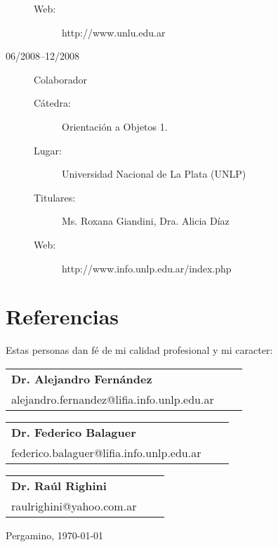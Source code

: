 \documentclass[a4paper]{article}
\begin{document}
\begin{description}
\begin{description}
    \item[Web: ] http://www.unlu.edu.ar
	\end{description}
\item[06/2008--12/2008] Colaborador
	\begin{description}
	\item[Cátedra: ] Orientación a Objetos 1.
	\item[Lugar: ] Universidad Nacional de La Plata (UNLP)
	\item[Titulares: ] Ms. Roxana Giandini, Dra. Alicia Díaz
    \item[Web: ] http://www.info.unlp.edu.ar/index.php
	\end{description}
\end{description}

\section{Referencias}
\noindent Estas personas dan fé de mi calidad profesional y mi caracter:
\begin{table}[h]
\begin{tabular}{@{}lll@{}}
\textbf{Dr. Alejandro Fernández} \\ alejandro.fernandez@lifia.info.unlp.edu.ar
\end{tabular}
\begin{tabular}{@{}lll@{}}
\textbf{Dr. Federico Balaguer}\\ federico.balaguer@lifia.info.unlp.edu.ar
\end{tabular}
\begin{tabular}{@{}lll@{}}
\textbf{Dr. Raúl Righini}\\ raulrighini@yahoo.com.ar
\end{tabular}
\end{table}


\vspace{2\baselineskip}
\noindent Pergamino, \today
\end{document}
